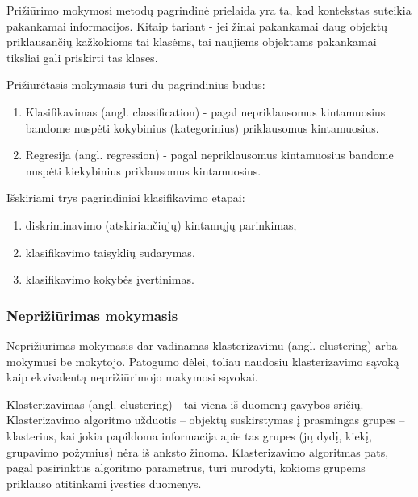 Prižiūrimo mokymosi metodų pagrindinė prielaida yra ta, kad kontekstas suteikia
pakankamai informacijos. Kitaip tariant - jei žinai pakankamai daug objektų priklausančių kažkokioms tai 
klasėms, tai naujiems objektams pakankamai tiksliai gali priskirti tas klases.

Prižiūrėtasis mokymasis turi du pagrindinius būdus:
\begin{enumerate}
  \item Klasifikavimas (angl. classification) - pagal nepriklausomus
  kintamuosius bandome nuspėti kokybinius (kategorinius) priklausomus kintamuosius. 
  \item Regresija (angl. regression) - pagal nepriklausomus kintamuosius bandome
  nuspėti kiekybinius priklausomus kintamuosius.
\end{enumerate}

Išskiriami trys pagrindiniai klasifikavimo etapai:
\begin{enumerate}
  \item diskriminavimo (atskiriančiųjų) kintamųjų parinkimas,
  \item klasifikavimo taisyklių sudarymas,
  \item klasifikavimo kokybės įvertinimas.
\end{enumerate}



\subsubsection{Neprižiūrimas mokymasis}

Neprižiūrimas mokymasis dar vadinamas klasterizavimu (angl. clustering) arba
mokymusi be mokytojo. Patogumo dėlei, toliau naudosiu klasterizavimo sąvoką kaip
ekvivalentą neprižiūrimojo makymosi sąvokai.


Klasterizavimas (angl.  clustering) - tai viena iš duomenų gavybos sričių. Klasterizavimo 
algoritmo užduotis – objektų suskirstymas  į prasmingas 
grupes – klasterius, kai jokia papildoma informacija apie tas grupes (jų dydį, kiekį, grupavimo požymius) nėra iš anksto žinoma.
%
% 
Klasterizavimo algoritmas pats, pagal pasirinktus algoritmo parametrus, turi nurodyti, kokioms 
grupėms priklauso atitinkami įvesties duomenys.\cite{martisiute08}

